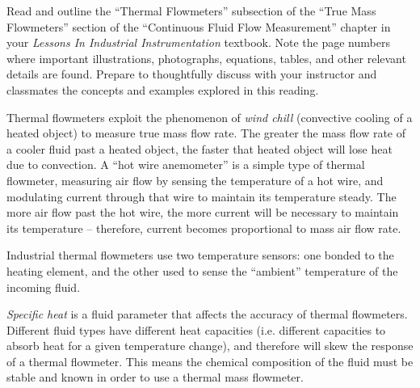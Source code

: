 

Read and outline the ``Thermal Flowmeters'' subsection of the ``True Mass Flowmeters'' section of the ``Continuous Fluid Flow Measurement'' chapter in your {\it Lessons In Industrial Instrumentation} textbook.  Note the page numbers where important illustrations, photographs, equations, tables, and other relevant details are found.  Prepare to thoughtfully discuss with your instructor and classmates the concepts and examples explored in this reading.














Thermal flowmeters exploit the phenomenon of {\it wind chill} (convective cooling of a heated object) to measure true mass flow rate.  The greater the mass flow rate of a cooler fluid past a heated object, the faster that heated object will lose heat due to convection.  A ``hot wire anemometer'' is a simple type of thermal flowmeter, measuring air flow by sensing the temperature of a hot wire, and modulating current through that wire to maintain its temperature steady.  The more air flow past the hot wire, the more current will be necessary to maintain its temperature -- therefore, current becomes proportional to mass air flow rate.

\vskip 10pt

Industrial thermal flowmeters use two temperature sensors: one bonded to the heating element, and the other used to sense the ``ambient'' temperature of the incoming fluid.

\vskip 10pt

{\it Specific heat} is a fluid parameter that affects the accuracy of thermal flowmeters.  Different fluid types have different heat capacities (i.e. different capacities to absorb heat for a given temperature change), and therefore will skew the response of a thermal flowmeter.  This means the chemical composition of the fluid must be stable and known in order to use a thermal mass flowmeter.








